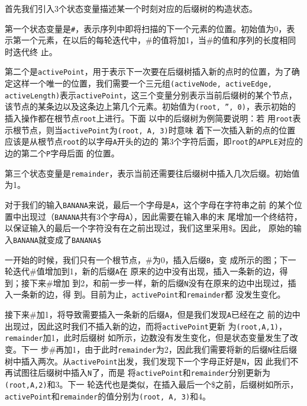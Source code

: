 首先我们引入3个状态变量描述某一个时刻对应的后缀树的构造状态。

第一个状态变量是\texttt{\#}，表示序列中即将扫描的下一个元素的位置。初始值为0，表
示第一个元素，在以后的每轮迭代中，\#的值将加1，当\#的值和序列的长度相同时迭代终
止。
  
第二个是\texttt{activePoint}，用于表示下一次要在后缀树插入新的点时的位置，为了确
定这样一个唯一的位置，我们需要一个三元组\texttt{(activeNode, activeEdge,
  activeLength)}表示\texttt{activePoint}，这三个变量分别表示当前后缀树的某个节点，
该节点的某条边以及这条边上第几个元素。初始值为\texttt{(root, '', 0)}，表示初始的
插入操作都在根节点\texttt{root}上进行。下面
以中的后缀树为例简要说明：若
用\texttt{root}表示根节点，则当\texttt{activePoint}为\texttt{(root, A, 3)}时意味
着下一次插入新的点的位置应该是从根节点\texttt{root}的以字母\texttt{A}开头的边的
第3个字符后面，即\texttt{root}的\texttt{APPLE}对应的边的第二个\texttt{P}字母后面
的位置。
  
第三个状态变量是\texttt{remainder}，表示当前还需要往后缀树中插入几次后缀。初始值
为1。

对于我们的输入\texttt{BANANA}来说，最后一个字母是\texttt{A}，这个字母在字符串之前
的某个位置中出现过（\texttt{BANANA}共有3个字母\texttt{A}），因此需要在输入串的末
尾增加一个终结符，以保证输入的最后一个字符没有在之前出现过，我们这里采用\$。因此，
原始的输入\texttt{BANANA}就变成了\texttt{BANANA\$}

一开始的时候，我们只有一个根节点，\#为0，插入后缀\texttt{B}，变
成所示的图；下一轮迭代\#值增加到1，新的后缀\texttt{A}在
原来的边中没有出现，插入一条新的边，得到；接下来\#增加
到2，和前一步一样，新的后缀\texttt{N}没有在原来的边中出现过，插入一条新的边，得
到。目前为止，\texttt{activePoint}和\texttt{remainder}都
没发生变化。

接下来\#加1，将导致需要插入一条新的后缀\texttt{A}，但是我们发现\texttt{A}已经在之
前的边中出现过，因此这时我们不插入新的边，而将\texttt{activePoint}更新
为\texttt{(root,A,1)}，\texttt{remainder}加1，此时后缀树
如所示，边数没有发生变化，但是状态变量发生了改变。下一
步\#再加1，由于此时\texttt{remainder}为2，因此我们需要将新的后缀\texttt{N}往后缀
树中插入两次。从\texttt{activePoint}出发，我们发现下一个字母正好是\texttt{N}，因
此我们不再试图往后缀树中插入\texttt{N}了，而是
将\texttt{activePoint}和\texttt{remainder}分别更新为\texttt{(root,A,2)}和3。下一
轮迭代也是类似，在插入最后一个\$之前，后缀树如所示，
\texttt{activePoint}和\texttt{remainder}的值分别为\texttt{(root, A, 3)}和4。


